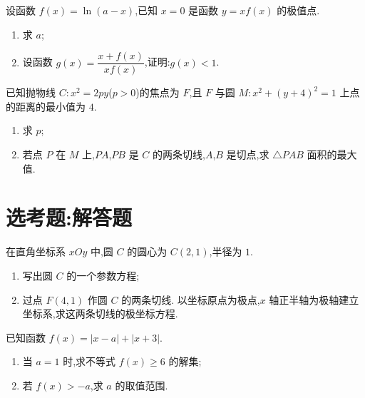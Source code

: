 \begin{problem}
设函数 \(f(x)=\ln(a-x)\),已知 \(x=0\) 是函数 \(y=xf(x)\) 的极值点.

\begin{enumerate}
\item 求 \(a\);

\item 设函数 \(g(x)=\dfrac{x+f(x)}{xf(x)}\),证明:\(g(x)<1\).
\end{enumerate}
\end{problem}

\begin{problem}
已知抛物线 \(C:x^2=2py\)(\(p>0\))的焦点为 \(F\),且 \(F\) 与圆 \(M:x^2+(y+4)^2=1\) 上点的距离的最小值为 \(4\).

\begin{enumerate}
\item 求 \(p\);

\item 若点 \(P\) 在 \(M\) 上,\(PA\),\(PB\) 是 \(C\) 的两条切线,\(A\),\(B\) 是切点,求 \(\triangle PAB\) 面积的最大值.
\end{enumerate}
\end{problem}

\section{选考题:解答题}

\begin{problem}
在直角坐标系 \(xOy\) 中,圆 \(C\) 的圆心为 \(C(2,1)\),半径为 \(1\).

\begin{enumerate}
\item 写出圆 \(C\) 的一个参数方程;

\item 过点 \(F(4,1)\) 作圆 \(C\) 的两条切线. 以坐标原点为极点,\(x\) 轴正半轴为极轴建立坐标系,求这两条切线的极坐标方程.
\end{enumerate}
\end{problem}

\begin{problem}
已知函数 \(f(x)=|x-a|+|x+3|\).

\begin{enumerate}
\item 当 \(a=1\) 时,求不等式 \(f(x)\ge 6\) 的解集;

\item 若 \(f(x)>-a\),求 \(a\) 的取值范围.
\end{enumerate}
\end{problem}

